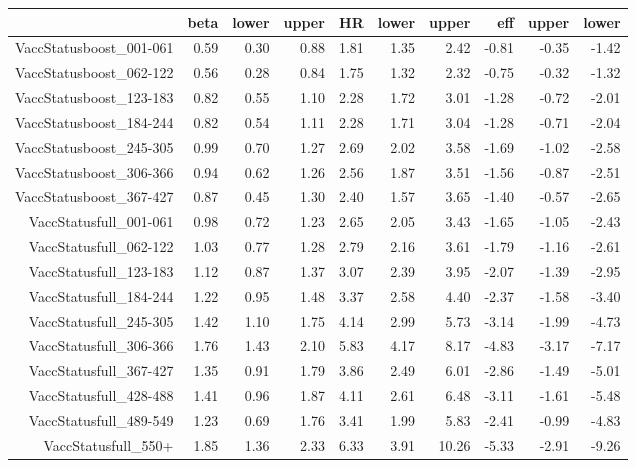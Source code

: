 \begin{table}[ht]
\centering
\begin{tabular}{rrrrrrrrrr}
  \hline
 & beta & lower & upper & HR & lower & upper & eff & upper & lower \\ 
  \hline
VaccStatusboost\_001-061 & 0.59 & 0.30 & 0.88 & 1.81 & 1.35 & 2.42 & -0.81 & -0.35 & -1.42 \\ 
  VaccStatusboost\_062-122 & 0.56 & 0.28 & 0.84 & 1.75 & 1.32 & 2.32 & -0.75 & -0.32 & -1.32 \\ 
  VaccStatusboost\_123-183 & 0.82 & 0.55 & 1.10 & 2.28 & 1.72 & 3.01 & -1.28 & -0.72 & -2.01 \\ 
  VaccStatusboost\_184-244 & 0.82 & 0.54 & 1.11 & 2.28 & 1.71 & 3.04 & -1.28 & -0.71 & -2.04 \\ 
  VaccStatusboost\_245-305 & 0.99 & 0.70 & 1.27 & 2.69 & 2.02 & 3.58 & -1.69 & -1.02 & -2.58 \\ 
  VaccStatusboost\_306-366 & 0.94 & 0.62 & 1.26 & 2.56 & 1.87 & 3.51 & -1.56 & -0.87 & -2.51 \\ 
  VaccStatusboost\_367-427 & 0.87 & 0.45 & 1.30 & 2.40 & 1.57 & 3.65 & -1.40 & -0.57 & -2.65 \\ 
  VaccStatusfull\_001-061 & 0.98 & 0.72 & 1.23 & 2.65 & 2.05 & 3.43 & -1.65 & -1.05 & -2.43 \\ 
  VaccStatusfull\_062-122 & 1.03 & 0.77 & 1.28 & 2.79 & 2.16 & 3.61 & -1.79 & -1.16 & -2.61 \\ 
  VaccStatusfull\_123-183 & 1.12 & 0.87 & 1.37 & 3.07 & 2.39 & 3.95 & -2.07 & -1.39 & -2.95 \\ 
  VaccStatusfull\_184-244 & 1.22 & 0.95 & 1.48 & 3.37 & 2.58 & 4.40 & -2.37 & -1.58 & -3.40 \\ 
  VaccStatusfull\_245-305 & 1.42 & 1.10 & 1.75 & 4.14 & 2.99 & 5.73 & -3.14 & -1.99 & -4.73 \\ 
  VaccStatusfull\_306-366 & 1.76 & 1.43 & 2.10 & 5.83 & 4.17 & 8.17 & -4.83 & -3.17 & -7.17 \\ 
  VaccStatusfull\_367-427 & 1.35 & 0.91 & 1.79 & 3.86 & 2.49 & 6.01 & -2.86 & -1.49 & -5.01 \\ 
  VaccStatusfull\_428-488 & 1.41 & 0.96 & 1.87 & 4.11 & 2.61 & 6.48 & -3.11 & -1.61 & -5.48 \\ 
  VaccStatusfull\_489-549 & 1.23 & 0.69 & 1.76 & 3.41 & 1.99 & 5.83 & -2.41 & -0.99 & -4.83 \\ 
  VaccStatusfull\_550+ & 1.85 & 1.36 & 2.33 & 6.33 & 3.91 & 10.26 & -5.33 & -2.91 & -9.26 \\ 

\end{tabular}
\end{table}
